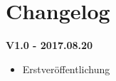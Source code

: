 \chapter{Changelog}
\large\textbf{V1.0 - 2017.08.20}\\[-1.5em]
\begin{itemize}
\item Erstveröffentlichung
\end{itemize}
